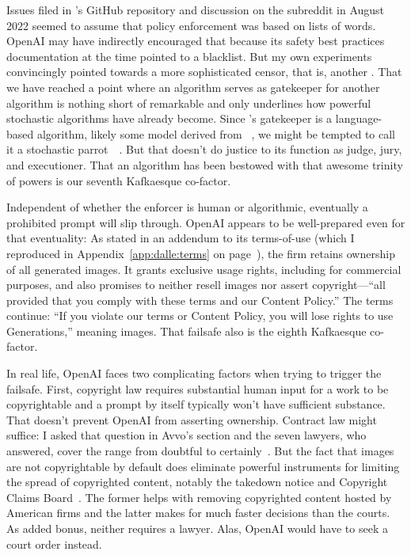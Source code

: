 Issues filed in \DALLE's GitHub repository and discussion on the subreddit in
August 2022 seemed to assume that policy enforcement was based on lists of
words. OpenAI may have indirectly encouraged that because its safety best
practices documentation at the time pointed to a  blacklist. But my own
experiments convincingly pointed towards a more sophisticated censor, that is,
another . That we have reached a point where an algorithm serves as
gatekeeper for another algorithm is nothing short of remarkable and only
underlines how powerful stochastic algorithms have already become. Since
\DALLE's gatekeeper is a language-based algorithm, likely some model derived
from ~\cite{BrownMannea2020}, we might be tempted to call it a
stochastic parrot~~\cite{BenderGebruea2021}. But that doesn't do
justice to its function as judge, jury, and executioner. That an algorithm has
been bestowed with that awesome trinity of powers is our seventh Kafkaesque
co-factor.

Independent of whether the enforcer is human or algorithmic, eventually a
prohibited prompt will slip through. OpenAI appears to be well-prepared even for
that eventuality: As stated in an addendum to its terms-of-use (which I
reproduced in Appendix~\ref{app:dalle:terms} on
page~\pageref{app:dalle:terms}), the firm retains ownership of all generated
images. It grants exclusive usage rights, including for commercial purposes, and
also promises to neither resell images nor assert copyright---``all provided
that you comply with these terms and our Content Policy.'' The terms continue:
``If you violate our terms or Content Policy, you will lose rights to use
Generations,'' meaning images. That failsafe also is the eighth Kafkaesque
co-factor.

In real life, OpenAI faces two complicating factors when trying to trigger the
failsafe. First,  copyright law requires substantial human input for a
work to be copyrightable and a prompt by itself typically won't have sufficient
substance. That doesn't prevent OpenAI from asserting ownership. Contract law
might suffice: I asked that question in Avvo's
 section and the seven lawyers, who
answered, cover the range from doubtful to certainly~\cite{Grimm2023}. But the
fact that images are not copyrightable by default does eliminate powerful
instruments for limiting the spread of copyrighted content, notably the 
takedown notice and Copyright Claims Board~\cite{CCB2022}. The former helps with
removing copyrighted content hosted by American firms and the latter makes for
much faster decisions than the courts. As added bonus, neither requires a
lawyer. Alas, OpenAI would have to seek a court order instead.

